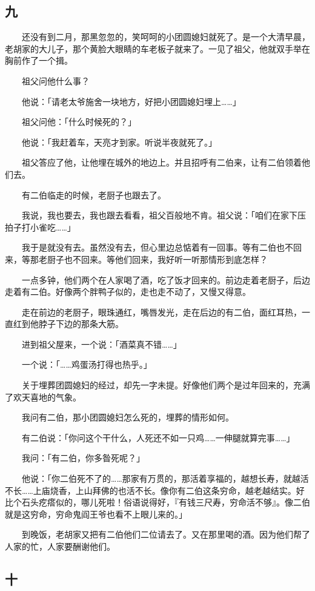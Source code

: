 \documentclass[UTF8]{ctexart}
\begin{document}
\subsection{九}

　　还没有到二月，那黑忽忽的，笑呵呵的小团圆媳妇就死了。是一个大清早晨，老胡家的大儿子，那个黄脸大眼睛的车老板子就来了。一见了祖父，他就双手举在胸前作了一个揖。

　　祖父问他什么事？

　　他说：「请老太爷施舍一块地方，好把小团圆媳妇埋上……」

　　祖父问他：「什么时候死的？」

　　他说：「我赶着车，天亮才到家。听说半夜就死了。」

　　祖父答应了他，让他埋在城外的地边上。并且招呼有二伯来，让有二伯领着他们去。

　　有二伯临走的时候，老厨子也跟去了。

　　我说，我也要去，我也跟去看看，祖父百般地不肯。祖父说：「咱们在家下压拍子打小雀吃……」

　　我于是就没有去。虽然没有去，但心里边总惦着有一回事。等有二伯也不回来，等那老厨子也不回来。等他们回来，我好听一听那情形到底怎样？

　　一点多钟，他们两个在人家喝了酒，吃了饭才回来的。前边走着老厨子，后边走着有二伯。好像两个胖鸭子似的，走也走不动了，又慢又得意。

　　走在前边的老厨子，眼珠通红，嘴唇发光，走在后边的有二伯，面红耳热，一直红到他脖子下边的那条大筋。

　　进到祖父屋来，一个说：「酒菜真不错……」

　　一个说：「……鸡蛋汤打得也热乎。」

　　关于埋葬团圆媳妇的经过，却先一字未提。好像他们两个是过年回来的，充满了欢天喜地的气象。

　　我问有二伯，那小团圆媳妇怎么死的，埋葬的情形如何。

　　有二伯说：「你问这个干什么，人死还不如一只鸡……一伸腿就算完事……」

　　我问：「有二伯，你多昝死呢？」

　　他说：「你二伯死不了的……那家有万贯的，那活着享福的，越想长寿，就越活不长……上庙烧香，上山拜佛的也活不长。像你有二伯这条穷命，越老越结实。好比个石头疙瘩似的，哪儿死啦！俗语说得好，『有钱三尺寿，穷命活不够』。像二伯就是这穷命，穷命鬼阎王爷也看不上眼儿来的。」

　　到晚饭，老胡家又把有二伯他们二位请去了。又在那里喝的酒。因为他们帮了人家的忙，人家要酬谢他们。

\subsection{十}
\end{document}
